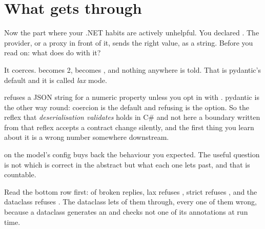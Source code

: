 \section{What gets through}
\label{sec:ai-what-gets-through}

Now the part where your .NET habits are actively unhelpful. You declared
. The provider, or a proxy in front of it, sends
 \dash{} the right value, as a string. Before you read on: what
does  do with it?



It coerces.  becomes \num{2},  becomes ,
and nothing anywhere is told. That is pydantic's default and it is called
\emph{lax} mode.

\begin{trapbox}
 refuses a JSON string for a numeric property unless
you opt in with . pydantic is the other way round:
coercion is the default and refusing is the option. So the reflex that
\emph{deserialisation validates} holds in C\# and not here \dash{} a
boundary written from that reflex accepts a contract change silently, and
the first thing you learn about it is a wrong number somewhere downstream.
\end{trapbox}

 on the model's config buys back the behaviour you
expected. The useful question is not which is correct in the abstract but
what each one lets past, and that is countable.




Read the bottom row first: of  broken replies, lax refuses
, strict refuses , and the
dataclass refuses . The dataclass lets
 of them through, every one of them wrong, because a
dataclass generates an  and checks not one of its
annotations at run time.

